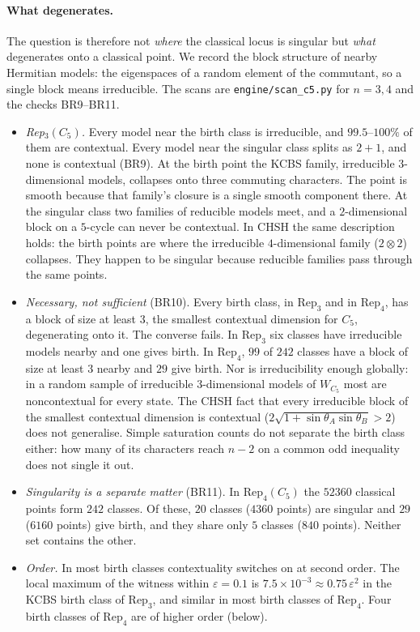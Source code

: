 \documentclass[11pt]{article}
\theoremstyle{definition}\newtheorem{definition}[theorem]{Definition}\newtheorem{remark}[theorem]{Remark}\newtheorem{example}[theorem]{Example}
\begin{document}
\paragraph{What degenerates.}
The question is therefore not \emph{where} the classical locus is singular but \emph{what} degenerates onto a classical point. We record
the block structure of nearby Hermitian models: the eigenspaces of a random element of the commutant, so a single block means
irreducible. The scans are \texttt{engine/scan\_c5.py} for $n=3,4$ and the checks BR9--BR11.
\begin{itemize}
\item \emph{Rep$_3(C_5)$.} Every model near the birth class is irreducible, and $99.5$--$100\%$ of them are contextual. Every model near
  the singular class splits as $2+1$, and none is contextual (BR9). At the birth point the KCBS family, irreducible $3$-dimensional
  models, collapses onto three commuting characters. The point is smooth because that family's closure is a single smooth component
  there. At the singular class two families of reducible models meet, and a $2$-dimensional block on a $5$-cycle can never be
  contextual. In CHSH the same description holds: the birth points are where the irreducible $4$-dimensional family ($2\otimes2$)
  collapses. They happen to be singular because reducible families pass through the same points.
\item \emph{Necessary, not sufficient} (BR10). Every birth class, in $\mathrm{Rep}_3$ and in $\mathrm{Rep}_4$, has a block of size at least
  $3$, the smallest contextual dimension for $C_5$, degenerating onto it. The converse fails. In $\mathrm{Rep}_3$ six classes have
  irreducible models nearby and one gives birth. In $\mathrm{Rep}_4$, $99$ of $242$ classes have a block of size at least $3$ nearby and
  $29$ give birth. Nor is irreducibility enough globally: in a random sample of irreducible $3$-dimensional models of $W_{C_5}$ most are
  noncontextual for every state. The CHSH fact that every irreducible block of the smallest contextual dimension is contextual
  ($2\sqrt{1+\sin\theta_A\sin\theta_B}>2$) does not generalise. Simple saturation counts do not separate the birth class either: how many
  of its characters reach $n-2$ on a common odd inequality does not single it out.
\item \emph{Singularity is a separate matter} (BR11). In $\mathrm{Rep}_4(C_5)$ the $52360$ classical points form $242$ classes. Of these,
  $20$ classes ($4360$ points) are singular and $29$ ($6160$ points) give birth, and they share only $5$ classes ($840$ points). Neither
  set contains the other.
\item \emph{Order.} In most birth classes contextuality switches on at second order. The local maximum of the witness within
  $\varepsilon=0.1$ is $7.5\times10^{-3}\approx0.75\,\varepsilon^2$ in the KCBS birth class of $\mathrm{Rep}_3$, and similar in most birth
  classes of $\mathrm{Rep}_4$. Four birth classes of $\mathrm{Rep}_4$ are of higher order (below).
\end{itemize}
\end{document}
